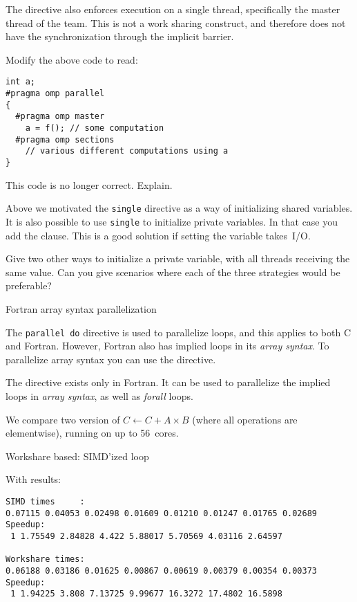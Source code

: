 The  directive also enforces execution
on a single thread, specifically the master thread of the team.
This is not a work sharing construct, and therefore
does not have the synchronization through the implicit barrier.

\begin{exercise}
  Modify the above code to read:
\begin{lstlisting}
int a;
#pragma omp parallel
{
  #pragma omp master
    a = f(); // some computation
  #pragma omp sections
    // various different computations using a
}
\end{lstlisting}
  This code is no longer correct. Explain.
\end{exercise}

Above we motivated the \lstinline{single} directive as a way of initializing
shared variables. It is also possible to use \lstinline{single} to initialize
private variables. In that case you add the 
clause. This is a good solution if setting the variable takes~I/O.

\begin{exercise}
  Give two other ways to initialize a private variable, with all
  threads receiving the same value. Can you give scenarios where each
  of the three strategies would be preferable?
\end{exercise}

 {Fortran array syntax parallelization}
\label{sec:fortran-workshare}

The \lstinline{parallel do} directive is used to parallelize loops,
and this applies to both C and Fortran. However, Fortran also
has implied loops in its \emph{array syntax}.
To parallelize array syntax you can use the 
directive.

The  directive exists only in Fortran.
It can be used to parallelize
the implied loops in \emph{array syntax},
as well as  \emph{forall} loops.

We compare two version of $C\leftarrow C+A\times B$
(where all operations are elementwise),
running on 
up to 56~cores.

\begin{multicols}{2}
  Workshare based:
  \columnbreak
  SIMD'ized loop
\end{multicols}

With results:

\begin{verbatim}
SIMD times     :
0.07115 0.04053 0.02498 0.01609 0.01210 0.01247 0.01765 0.02689
Speedup:
 1 1.75549 2.84828 4.422 5.88017 5.70569 4.03116 2.64597

Workshare times:
0.06188 0.03186 0.01625 0.00867 0.00619 0.00379 0.00354 0.00373
Speedup:
 1 1.94225 3.808 7.13725 9.99677 16.3272 17.4802 16.5898  
\end{verbatim}
